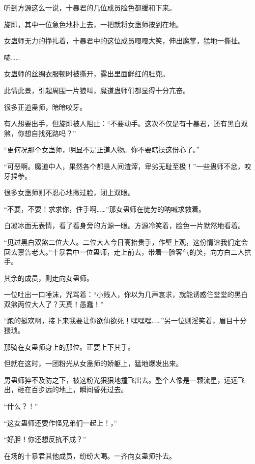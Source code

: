 
\begin{this_body}



听到方源这么一说，十暴君的几位成员脸色都缓和下来。

旋即，其中一位急色地扑上去，一把就将女蛊师按到在地。

女蛊师无力的挣扎着，十暴君中的这位成员嘎嘎大笑，伸出魔掌，猛地一撕扯。

哧……

女蛊师的丝绸衣服顿时被撕开，露出里面鲜红的肚兜。

此情此景，引起周围一片狼叫，魔道蛊师们都显得十分亢奋。

很多正道蛊师，暗暗咬牙。

有人想要出手，但旋即被人阻止：“不要动手。这次不仅是有十暴君，还有黑白双煞，你想自找死路吗？”

“更何况那个女蛊师，明显不是正道人物。你不要瞎操这份心了。”

“可恶啊。魔道中人，果然各个都是人间渣滓，卑劣无耻至极！”一些蛊师不忿，咬牙捏拳。

很多女蛊师则不忍心地撇过脸，闭上双眼。

“不要，不要！求求你，住手啊……”那女蛊师在徒劳的呐喊求救着。

白凝冰面无表情，看了看身旁的方源一眼。方源冷笑着，脸色一片默然地看着。

“见过黑白双煞二位大人。二位大人今日高抬贵手，作壁上观，这份情谊我们定会回去禀告老大。”十暴君中一位蛊师，走上前去，带着一脸客气的笑，向方白二人拱手。

其余的成员，则走向女蛊师。

一位吐出一口唾沫，咒骂着：“小贱人，你以为几声哀求，就能诱惑住堂堂的黑白双煞两位大人了？天真！愚蠢！”

“跑的挺欢啊，接下来我要让你欲仙欲死！嘿嘿嘿……”另一位则淫笑着，眉目十分猥琐。

那骑在女蛊师身上的那位。正要上下其手。

但就在这时，一团粉光从女蛊师的娇躯上，猛地爆发出来。

男蛊师猝不及防之下，被这粉光狠狠地撞飞出去。整个人像是一颗流星，远远飞出，砸在百步远的地上，瞬间昏死过去。

“什么？！”

“这女蛊师还要作怪兄弟们一起上！，”

“好胆！你还想反抗不成？”

在场的十暴君其他成员，纷纷大喝。一齐向女蛊师扑去。


\end{this_body}
